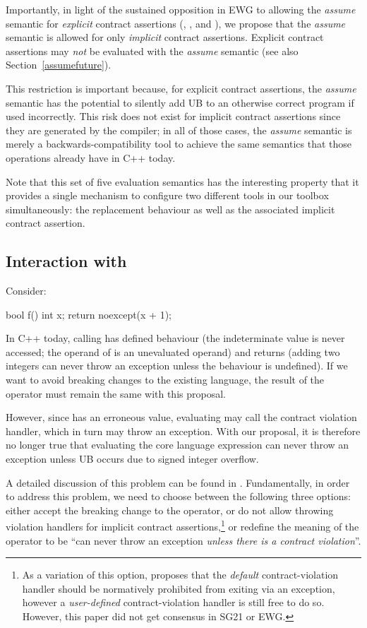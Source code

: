Importantly, in light of the sustained opposition in EWG to allowing the \emph{assume} semantic for \emph{explicit} contract assertions (, , and ), we propose that the \emph{assume} semantic is allowed for only \emph{implicit} contract assertions. Explicit contract assertions may \emph{not} be evaluated with the \emph{assume} semantic (see also Section~\ref{assumefuture}).

This restriction is important because, for explicit contract assertions, the \emph{assume} semantic  has the potential to silently add UB to an otherwise correct program if used incorrectly. This risk does not exist for implicit contract assertions since they are generated by the compiler;  in all of those cases, the \emph{assume} semantic is merely a backwards-compatibility tool to achieve the same semantics that those operations already have in C++ today.

Note that this set of five evaluation semantics has the interesting property that it provides a single mechanism to configure two different tools in our toolbox simultaneously: the replacement behaviour as well as the associated implicit contract assertion.

\subsection{Interaction with }

Consider:
\begin{codeblock}
bool f() {
  int x;
  return noexcept(x + 1);
}
\end{codeblock}
In C++ today, calling  has defined behaviour (the indeterminate value is never accessed; the operand of  is an unevaluated operand) and returns  (adding two integers can never throw an exception unless the behaviour is undefined). If we want to avoid breaking changes to the existing language, the result of the  operator must remain the same with this proposal.

However, since  has an erroneous value, evaluating  may call the contract violation handler, which in turn may throw an exception. With our proposal, it is therefore no longer true that evaluating the core language expression  can never throw an exception unless UB occurs due to signed integer overflow.

A detailed discussion of this problem can be found in \cite{P3541R1}. Fundamentally, in order to address this problem, we need to choose between the following three options: either accept the breaking change to the  operator, or do not allow throwing violation handlers for implicit contract assertions,\footnote{As a variation of this option, \cite{P3577R0} proposes that the \emph{default} contract-violation handler should be normatively prohibited from exiting via an exception, however a \emph{user-defined} contract-violation handler is still free to do so. However, this paper did not get consensus in SG21 or EWG.} or redefine the meaning of the  operator to be ``can never throw an exception \emph{unless there is a contract violation}''. 


